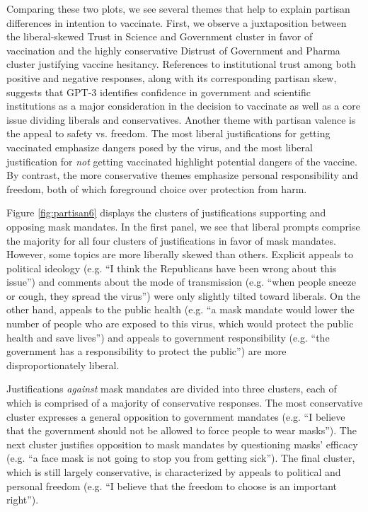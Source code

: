 \documentclass{article}
\begin{document}
Comparing these two plots, we see several themes that help to explain
partisan differences in intention to vaccinate. First, we observe a
juxtaposition between the liberal-skewed Trust in Science and Government
cluster in favor of vaccination and the highly conservative Distrust of
Government and Pharma cluster justifying vaccine hesitancy. References
to institutional trust among both positive and negative responses, along
with its corresponding partisan skew, suggests that GPT-3 identifies
confidence in government and scientific institutions as a major
consideration in the decision to vaccinate as well as a core issue
dividing liberals and conservatives. Another theme with partisan valence
is the appeal to safety vs. freedom. The most liberal justifications for
getting vaccinated emphasize dangers posed by the virus, and the most
liberal justification for \emph{not} getting vaccinated highlight
potential dangers of the vaccine. By contrast, the more conservative
themes emphasize personal responsibility and freedom, both of which
foreground choice over protection from harm.

Figure \ref{fig:partisan6} displays the clusters of justifications supporting and
opposing mask mandates. In the first panel, we see that liberal prompts
comprise the majority for all four clusters of justifications in favor
of mask mandates. However, some topics are more liberally skewed than
others. Explicit appeals to political ideology (e.g. ``I think the
Republicans have been wrong about this issue'') and comments about the
mode of transmission (e.g. ``when people sneeze or cough, they spread
the virus'') were only slightly tilted toward liberals. On the other
hand, appeals to the public health (e.g. ``a mask mandate would lower
the number of people who are exposed to this virus, which would protect
the public health and save lives'') and appeals to government
responsibility (e.g. ``the government has a responsibility to protect
the public'') are more disproportionately liberal.

Justifications \emph{against} mask mandates are divided into three
clusters, each of which is comprised of a majority of conservative
responses. The most conservative cluster expresses a general opposition
to government mandates (e.g. ``I believe that the government should not
be allowed to force people to wear masks''). The next cluster justifies
opposition to mask mandates by questioning masks' efficacy (e.g. ``a
face mask is not going to stop you from getting sick''). The final
cluster, which is still largely conservative, is characterized by
appeals to political and personal freedom (e.g. ``I believe that the
freedom to choose is an important right'').
\end{document}
